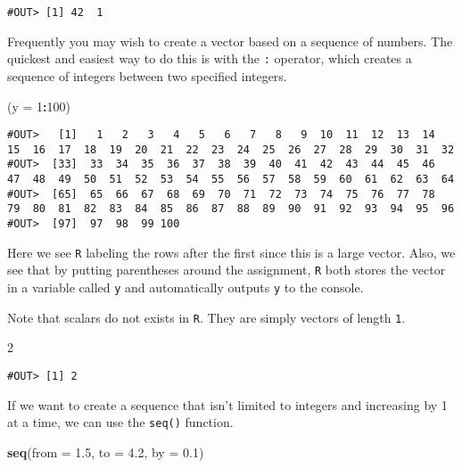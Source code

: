 \documentclass[]{book}
\newenvironment{Shaded}{\begin{snugshade}}{\end{snugshade}}
\newcommand{\DataTypeTok}[1]{\textcolor[rgb]{0.13,0.29,0.53}{#1}}
\newcommand{\DecValTok}[1]{\textcolor[rgb]{0.00,0.00,0.81}{#1}}
\newcommand{\FloatTok}[1]{\textcolor[rgb]{0.00,0.00,0.81}{#1}}
\newcommand{\KeywordTok}[1]{\textcolor[rgb]{0.13,0.29,0.53}{\textbf{#1}}}
\newcommand{\NormalTok}[1]{#1}
\newcommand{\OperatorTok}[1]{\textcolor[rgb]{0.81,0.36,0.00}{\textbf{#1}}}
\begin{document}
\begin{verbatim}
#OUT> [1] 42  1
\end{verbatim}

Frequently you may wish to create a vector based on a sequence of numbers. The quickest and easiest way to do this is with the \texttt{:} operator, which creates a sequence of integers between two specified integers.

\begin{Shaded}
\begin{Highlighting}[]
\NormalTok{(}\DataTypeTok{y =} \DecValTok{1}\OperatorTok{:}\DecValTok{100}\NormalTok{)}
\end{Highlighting}
\end{Shaded}

\begin{verbatim}
#OUT>   [1]   1   2   3   4   5   6   7   8   9  10  11  12  13  14  15  16  17  18  19  20  21  22  23  24  25  26  27  28  29  30  31  32
#OUT>  [33]  33  34  35  36  37  38  39  40  41  42  43  44  45  46  47  48  49  50  51  52  53  54  55  56  57  58  59  60  61  62  63  64
#OUT>  [65]  65  66  67  68  69  70  71  72  73  74  75  76  77  78  79  80  81  82  83  84  85  86  87  88  89  90  91  92  93  94  95  96
#OUT>  [97]  97  98  99 100
\end{verbatim}

Here we see \texttt{R} labeling the rows after the first since this is a large vector. Also, we see that by putting parentheses around the assignment, \texttt{R} both stores the vector in a variable called \texttt{y} and automatically outputs \texttt{y} to the console.

Note that scalars do not exists in \texttt{R}. They are simply vectors of length \texttt{1}.

\begin{Shaded}
\begin{Highlighting}[]
\DecValTok{2}
\end{Highlighting}
\end{Shaded}

\begin{verbatim}
#OUT> [1] 2
\end{verbatim}

If we want to create a sequence that isn't limited to integers and increasing by 1 at a time, we can use the \texttt{seq()} function.

\begin{Shaded}
\begin{Highlighting}[]
\KeywordTok{seq}\NormalTok{(}\DataTypeTok{from =} \FloatTok{1.5}\NormalTok{, }\DataTypeTok{to =} \FloatTok{4.2}\NormalTok{, }\DataTypeTok{by =} \FloatTok{0.1}\NormalTok{)}
\end{Highlighting}
\end{Shaded}
\end{document}
